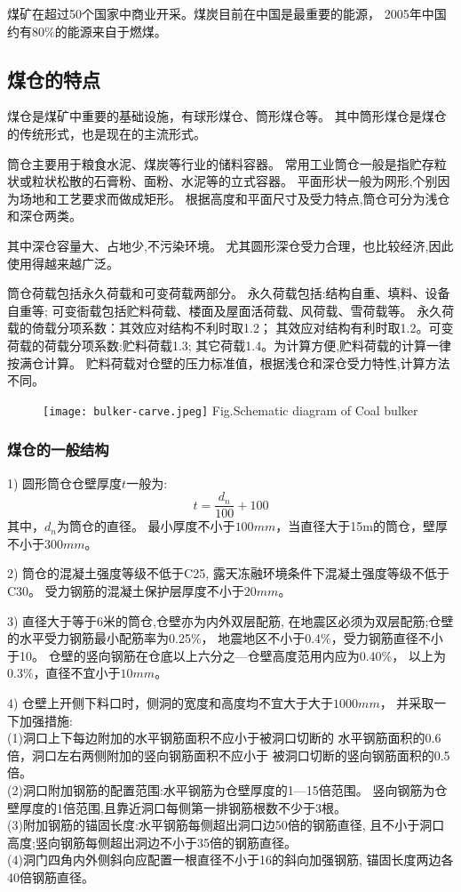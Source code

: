 煤矿在超过50个国家中商业开采。煤炭目前在中国是最重要的能源，
2005年中国约有$80\%$的能源来自于燃煤。

\subsection{煤仓的特点}
煤仓是煤矿中重要的基础设施，有球形煤仓、筒形煤仓等。
其中筒形煤仓是煤仓的传统形式，也是现在的主流形式。

筒仓主要用于粮食水泥、煤炭等行业的储料容器。
常用工业筒仓一般是指贮存粒状或粒状松散的石膏粉、面粉、水泥等的立式容器。
平面形状一般为网形,个别因为场地和工艺要求而做成矩形。
根据高度和平面尺寸及受力特点,筒仓可分为浅仓和深仓两类。

其中深仓容量大、占地少,不污染环境。
尤其圆形深仓受力合理，也比较经济,因此使用得越来越广泛。

筒仓荷载包括永久荷载和可变荷载两部分。
永久荷载包括:结构自重、填料、设备自重等;
可变衙载包括贮料荷载、楼面及屋面活荷载、风荷载、雪荷载等。
永久荷载的倚载分项系数：其效应对结构不利时取1.2；
其效应对结构有利时取1.2。可变荷载的荷载分项系数:贮料荷载1.3;
其它荷载1.4。为计算方便,贮料荷载的计算一律按满仓计算。
贮料荷载对仓壁的压力标准值，根据浅仓和深仓受力特性,计算方法不同。
\begin{figure}[!htbp]
   \centering
   \texttt{[image: bulker-carve.jpeg]}
		{Fig.}{Schematic diagram of Coal bulker}
\end{figure}

\subsubsection*{煤仓的一般结构}
1) 圆形筒仓仓壁厚度$t$一般为:
\begin{equation}
t=\frac{d_n}{100}+100
\end{equation}
其中，$d_n$为筒仓的直径。
最小厚度不小于$100mm$，当直径大于15m的筒仓，壁厚不小于$300mm$。

2) 筒仓的混凝土强度等级不低于C25,
	露天冻融环境条件下混凝土强度等级不低于C30。
	受力钢筋的混凝土保护层厚度不小于$20mm$。

3) 直径大于等于6米的筒仓,仓壁亦为内外双层配筋,
	在地震区必须为双层配筋;仓壁的水平受力钢筋最小配筋率为0.25\%，
	地震地区不小于0.4\%，受力钢筋直径不小于10。
	仓壁的竖向钢筋在仓底以上六分之—仓壁高度范用内应为0.40\%，
	以上为0.3\%，直径不宜小于$10mm$。

4) 仓壁上开侧下料口时，侧洞的宽度和高度均不宜大于大于$1000mm$，
	并采取一下加强措施:\\
    (1)洞口上下每边附加的水平钢筋面积不应小于被洞口切断的
	水平钢筋面积的0.6倍，洞口左右两侧附加的竖向钢筋面积不应小于
	被洞口切断的竖向钢筋面积的0.5倍。\\
    (2)洞口附加钢筋的配置范围:水平钢筋为仓壁厚度的1—15倍范围。
	竖向钢筋为仓壁厚度的1倍范围,且靠近洞口每侧第一排钢筋根数不少于3根。\\
    (3)附加钢筋的锚固长度:水平钢筋每侧超出洞口边50倍的钢筋直径,
	且不小于洞口高度;竖向钢筋每侧超出洞边不小于35倍的钢筋直径。\\
    (4)洞门四角内外侧斜向应配置一根直径不小于16的斜向加强钢筋,
	锚固长度两边各40倍钢筋直径。

